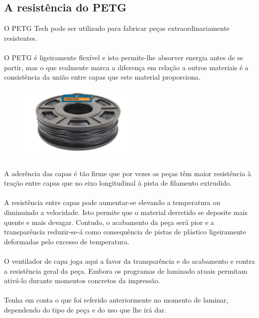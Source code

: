 \documentclass[11pt,a4paper]{article}
\begin{document}
	\subsection{A resistência do PETG}O PETG Tech pode ser utilizado para fabricar peças extraordinariamente resistentes.
\\\\
O PETG é ligeiramente flexível e isto permite-lhe absorver energia antes de se partir, mas o que realmente marca a diferença em relação a outros materiais é a consistência da união entre capas que este material proporciona.
\begin{figure}[H]
\centering
\includegraphics[width=0.5\textwidth,cfbox=azul_marcos 1pt 0pt]{FOTOS/PETG250NEGRO}
\end{figure}
A aderência das capas é tão firme que por vezes as peças têm maior resistência à tração entre capas que no eixo longitudinal à pista de filamento extrudido.
\\\\A resistência entre capas pode aumentar-se elevando a temperatura ou diminuindo a velocidade. Isto permite que o material derretido se deposite mais quente e mais devagar. Contudo, o acabamento da peça será pior e a transparência reduzir-se-á como consequência de pistas de plástico ligeiramente deformadas pelo excesso de temperatura.
\\\\O ventilador de capa joga aqui a favor da transparência e do acabamento e contra a resistência geral da peça. Embora os programas de laminado atuais permitam ativá-lo durante momentos concretos da impressão.
\\\\Tenha em conta o que foi referido anteriormente no momento de laminar, dependendo do tipo de peça e do uso que lhe irá dar.
\end{document}
